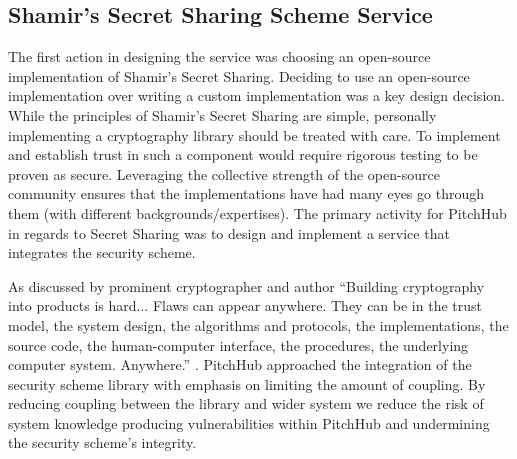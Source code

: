 \subsection{Shamir's Secret Sharing Scheme Service}\label{SS:design_shamir_secret_sharing_service}
The first action in designing the service was choosing an open-source implementation of Shamir's Secret Sharing. Deciding to use an open-source implementation over writing a custom implementation was a key design decision. While the principles of Shamir's Secret Sharing are simple, personally implementing a cryptography library should be treated with care. To implement and establish trust in such a component would require rigorous testing to be proven as secure. Leveraging the collective strength of the open-source community ensures that the implementations have had many eyes go through them (with different backgrounds/expertises). The primary activity for PitchHub in regards to Secret Sharing was to design and implement a service that integrates the security scheme.
\par
As discussed by prominent cryptographer and author \citeauthor{schneier1999cryptography} ``Building cryptography into products is hard... Flaws can appear anywhere. They can be in the trust model, the system design, the algorithms and protocols, the implementations, the source code, the human-computer interface, the procedures, the underlying computer system. Anywhere.'' \cite{schneier1999cryptography}. PitchHub  approached the integration of the security scheme library with emphasis on limiting the amount of coupling. By reducing coupling between the library and wider system we reduce the risk of system knowledge producing vulnerabilities within PitchHub and undermining the security scheme's integrity.
\par
